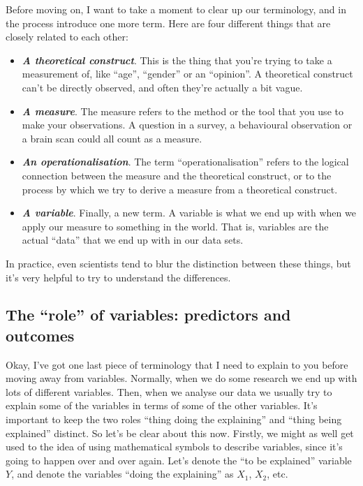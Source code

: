 \documentclass[
]{book}
\providecommand{\tightlist}{%
  \setlength{\itemsep}{0pt}\setlength{\parskip}{0pt}}
\begin{document}
Before moving on, I want to take a moment to clear up our terminology, and in the process introduce one more term. Here are four different things that are closely related to each other:

\begin{itemize}
\tightlist
\item
  \textbf{\emph{A theoretical construct}}. This is the thing that you're trying to take a measurement of, like ``age'', ``gender'' or an ``opinion''. A theoretical construct can't be directly observed, and often they're actually a bit vague.
\item
  \textbf{\emph{A measure}}. The measure refers to the method or the tool that you use to make your observations. A question in a survey, a behavioural observation or a brain scan could all count as a measure.
\item
  \textbf{\emph{An operationalisation}}. The term ``operationalisation'' refers to the logical connection between the measure and the theoretical construct, or to the process by which we try to derive a measure from a theoretical construct.
\item
  \textbf{\emph{A variable}}. Finally, a new term. A variable is what we end up with when we apply our measure to something in the world. That is, variables are the actual ``data'' that we end up with in our data sets.
\end{itemize}

In practice, even scientists tend to blur the distinction between these things, but it's very helpful to try to understand the differences.

\hypertarget{ivdv}{%
\subsection{The ``role'' of variables: predictors and outcomes}\label{ivdv}}

Okay, I've got one last piece of terminology that I need to explain to you before moving away from variables. Normally, when we do some research we end up with lots of different variables. Then, when we analyse our data we usually try to explain some of the variables in terms of some of the other variables. It's important to keep the two roles ``thing doing the explaining'' and ``thing being explained'' distinct. So let's be clear about this now. Firstly, we might as well get used to the idea of using mathematical symbols to describe variables, since it's going to happen over and over again. Let's denote the ``to be explained'' variable \(Y\), and denote the variables ``doing the explaining'' as \(X_1\), \(X_2\), etc.
\end{document}
